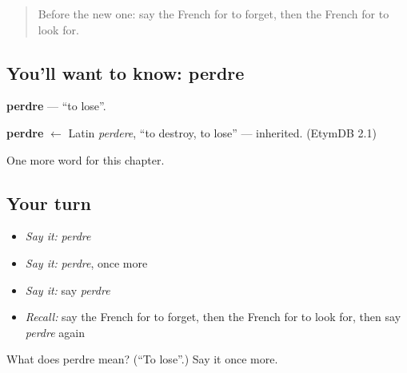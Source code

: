 \label{lesson:FR-C63-perdre}



\begin{quote}
Before the new one: say the French for to forget, then the French for to look for.
\end{quote}

\subsection*{You'll want to know: perdre}
\textbf{perdre} — \textquotedblleft{}to lose\textquotedblright{}.

\begin{cousinweb}
\textbf{perdre} $\leftarrow$ Latin \emph{perdere}, \textquotedblleft{}to destroy, to lose\textquotedblright{} — inherited. (EtymDB 2.1)
\end{cousinweb}

\begin{grammarlens}[title={What you've built}]
One more word for this chapter.
\end{grammarlens}

\subsection*{Your turn}
\begin{itemize}
\raggedright
  \item \emph{Say it:} \emph{perdre}
  \item \emph{Say it:} \emph{perdre}, once more
  \item \emph{Say it:} say \emph{perdre}
  \item \emph{Recall:} say the French for to forget, then the French for to look for, then say \emph{perdre} again
\end{itemize}

\begin{tcolorbox}[breakable,colback=teal!4,colframe=teal!35!black,title={Before you move on}]
What does perdre mean? (\textquotedblleft{}To lose\textquotedblright{}.) Say it once more.
\end{tcolorbox}
